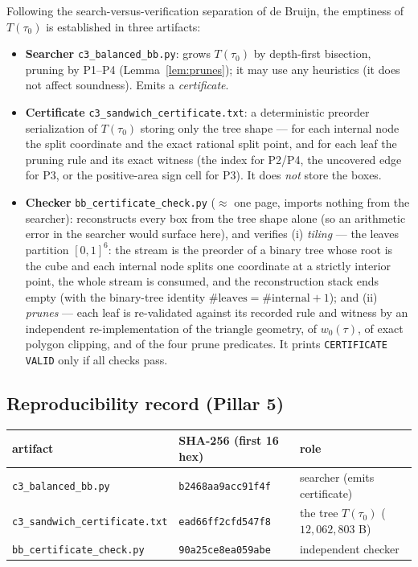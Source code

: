Following the search-versus-verification separation of de Bruijn, the
emptiness of $T(\tau_0)$ is established in three artifacts:
\begin{itemize}
\item \textbf{Searcher} \texttt{c3\_balanced\_bb.py}: grows $T(\tau_0)$ by
depth-first bisection, pruning by P1--P4 (Lemma~\ref{lem:prunes}); it may use
any heuristics (it does not affect soundness). Emits a \emph{certificate}.
\item \textbf{Certificate} \texttt{c3\_sandwich\_certificate.txt}: a
deterministic preorder serialization of $T(\tau_0)$ storing only the tree shape
--- for each internal node the split coordinate and the exact rational split
point, and for each leaf the pruning rule and its exact witness (the index for
P2/P4, the uncovered edge for P3, or the positive-area sign cell for P3). It
does \emph{not} store the boxes.
\item \textbf{Checker} \texttt{bb\_certificate\_check.py} ($\approx$ one page,
imports nothing from the searcher): reconstructs every box from the tree shape
alone (so an arithmetic error in the searcher would surface here), and verifies
(i) \emph{tiling} --- the leaves partition $[0,1]^6$: the stream is the preorder
of a binary tree whose root is the cube and each internal node splits one
coordinate at a strictly interior point, the whole stream is consumed, and the
reconstruction stack ends empty (with the binary-tree identity
$\#\text{leaves}=\#\text{internal}+1$); and (ii) \emph{prunes} --- each leaf is
re-validated against its recorded rule and witness by an independent
re-implementation of the triangle geometry, of $w_0(\tau)$, of exact polygon
clipping, and of the four prune predicates. It prints \texttt{CERTIFICATE VALID}
only if all checks pass.
\end{itemize}

\subsection*{Reproducibility record (Pillar 5)}

\begin{center}\small
\begin{tabular}{@{}lll@{}}
\hline
artifact & SHA-256 (first 16 hex) & role\\
\hline
\texttt{c3\_balanced\_bb.py}       & \texttt{b2468aa9acc91f4f} & searcher
(emits certificate)\\
\texttt{c3\_sandwich\_certificate.txt} & \texttt{ead66ff2cfd547f8} & the tree
$T(\tau_0)$ ($12{,}062{,}803$ B)\\
\texttt{bb\_certificate\_check.py} & \texttt{90a25ce8ea059abe} & independent
checker\\
\hline
\end{tabular}
\end{center}

